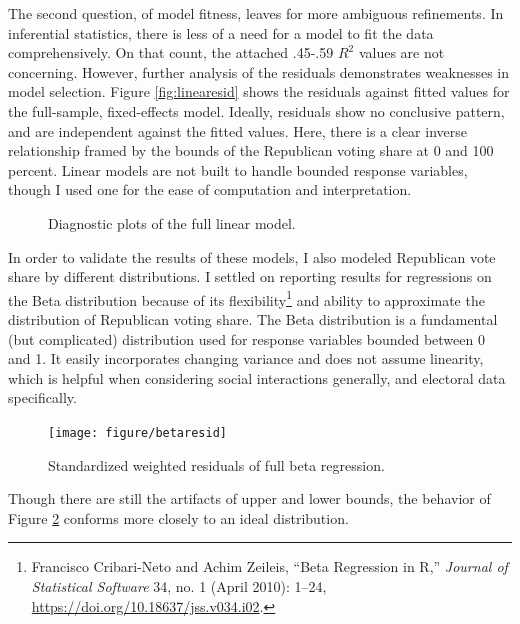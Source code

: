 \documentclass[12pt,oneside]{psthesis}
\begin{document}
The second question, of model fitness, leaves for more ambiguous refinements.
In inferential statistics, there is less of a need for a model to fit the data comprehensively.
On that count, the attached .45-.59 \(R^{2}\) values are not concerning.
However, further analysis of the residuals demonstrates weaknesses in model selection.
Figure \ref{fig:linearesid} shows the residuals against fitted values for the full-sample, fixed-effects model.
Ideally, residuals show no conclusive pattern, and are independent against the fitted values.
Here, there is a clear inverse relationship framed by the bounds of the Republican voting share at 0 and 100 percent.
Linear models are not built to handle bounded response variables, though I used one for the ease of computation and interpretation.
\begin{figure}

{\centering {}

}

\caption{Diagnostic plots of the full linear model.}\label{fig:linear}
\end{figure}
In order to validate the results of these models, I also modeled Republican vote share by different distributions.
I settled on reporting results for regressions on the Beta distribution because of its flexibility\footnote{Francisco Cribari-Neto and Achim Zeileis, ``Beta Regression in R,'' \emph{Journal of Statistical Software} 34, no. 1 (April 2010): 1--24, \url{https://doi.org/10.18637/jss.v034.i02}.} and ability to approximate the distribution of Republican voting share.
The Beta distribution is a fundamental (but complicated) distribution used for response variables bounded between 0 and 1.
It easily incorporates changing variance and does not assume linearity, which is helpful when considering social interactions generally, and electoral data specifically.
\begin{figure}

{\centering \texttt{[image: figure/betaresid]} 

}

\caption{Standardized weighted residuals of full beta regression.}\label{fig:betaresid}
\end{figure}
Though there are still the artifacts of upper and lower bounds, the behavior of Figure \ref{fig:betaresid} conforms more closely to an ideal distribution.
\end{document}
